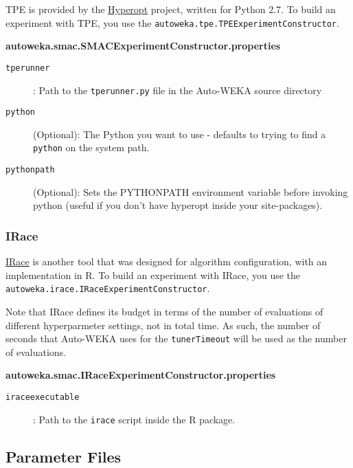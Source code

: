TPE is provided by the \href{http://jaberg.github.com/hyperopt/}{Hyperopt} project, written for Python 2.7. To build an experiment with TPE, you use the \texttt{autoweka.tpe.TPEExperimentConstructor}. 

\textbf{autoweka.smac.SMACExperimentConstructor.properties}
\begin{description}
 \item[\texttt{tperunner}]: Path to the \texttt{tperunner.py} file in the Auto-WEKA source directory
 \item[\texttt{python}] (Optional): The Python you want to use - defaults to trying to find a \texttt{python} on the system path.
 \item[\texttt{pythonpath}] (Optional): Sets the PYTHONPATH environment variable before invoking python (useful if you don't have hyperopt inside your site-packages).
\end{description}

\subsubsection{IRace}

\href{http://iridia.ulb.ac.be/irace/}{IRace} is another tool that was designed for algorithm configuration, with an implementation in R. To build an experiment with IRace, you use the \texttt{autoweka.irace.IRaceExperimentConstructor}. 
\begin{aside}
  Note that IRace defines its budget in terms of the number of evaluations of different hyperparmeter settings, not in total time. As such, the number of seconds that Auto-WEKA uses for the \texttt{tunerTimeout} will be used as the number of evaluations.
\end{aside}

\textbf{autoweka.smac.IRaceExperimentConstructor.properties}
\begin{description}
  \item[\texttt{iraceexecutable}]: Path to the \texttt{irace} script inside the R package.
\end{description}

\subsection{Parameter Files}\label{sec:paramfiles}

